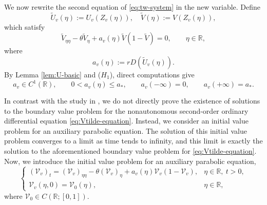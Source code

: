 \documentclass[preprint,sort&compress,final,12pt]{elsarticle}
\numberwithin{equation}{section}
\begin{document}
We now rewrite the second equation of \eqref{eq:tw-system} in the new variable. Define
\begin{equation*}
\widetilde U_v(\eta):=U_v(Z_v(\eta)),\quad\widetilde V(\eta):=V(Z_v(\eta)),
\end{equation*}
which satisfy
\begin{equation}\label{eq:Vtilde-equation}
\widetilde V_{\eta\eta}-\theta\widetilde V_\eta+a_v(\eta)\widetilde V(1-\widetilde V)=0,\qquad \eta\in\mathbb R,
\end{equation}
where
\begin{equation*}
a_v(\eta):=rD(\widetilde U_v(\eta)).
\end{equation*}
By Lemma \ref{lem:U-basic} and ($H_1$), direct computations give
\begin{equation*}
a_v\in C^1(\mathbb{R}),\qquad0<a_v(\eta)\le a_*,\qquad a_v(-\infty)=0,\qquad
a_v(+\infty)=a_*.
\end{equation*}

In contrast with the study in \cite{ChenQi2025}, we do not directly prove the existence of solutions to the boundary value problem for the nonautonomous second-order ordinary differential equation \eqref{eq:Vtilde-equation}. Instead, we consider an initial value problem for an auxiliary parabolic equation. The solution of this initial value problem converges to a limit as time tends to infinity, and this limit is exactly the solution to the aforementioned boundary value problem for \eqref{eq:Vtilde-equation}. Now, we introduce the initial value problem for an auxiliary parabolic equation,
\begin{equation}\label{eq:aux-parabolic}
\begin{cases}
(\mathcal V_v)_t=(\mathcal V_v)_{\eta\eta}-\theta(\mathcal V_v)_\eta+a_v(\eta)\mathcal V_v(1-\mathcal V_v),
& \eta\in\mathbb R,\ t>0,\\[0.2cm]
\mathcal V_v(\eta,0)=\mathcal V_0(\eta),
& \eta\in\mathbb R,
\end{cases}
\end{equation}
where $\mathcal V_0\in C(\mathbb{R};[0,1])$.
\end{document}
